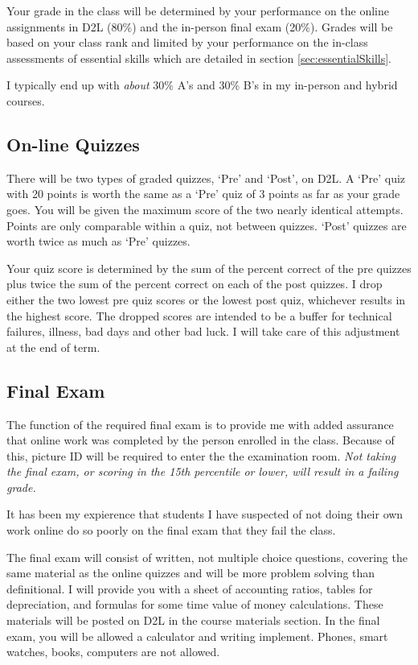 \documentclass[letterpaper,10pt]{article}
\begin{document}
\else
  Your grade in the class will be determined by your performance on the online assignments in D2L (80\%) and the in-person final exam (20\%).  Grades will be based on your class rank and limited by your performance on the in-class assessments of essential skills which are detailed in section \ref{sec:essentialSkills}. 
  
  I typically end up with \emph{about} 30\%
  A's and 30\% B's in my in-person and hybrid courses.    
\fi

\subsection{On-line Quizzes}

There will be two types of graded quizzes, `Pre' and `Post', on D2L.  A `Pre'
quiz with 20 points is worth the same as a `Pre' quiz of 3 points as
far as your grade goes.  You will be given the maximum score of the two nearly identical attempts. Points are only comparable within a quiz, not between quizzes.  `Post' quizzes are worth twice as much as `Pre' quizzes.


Your quiz score is determined by the sum of the percent correct of the pre quizzes plus twice the sum of the percent correct on each of the post quizzes. I drop either the two lowest pre quiz scores or the lowest post quiz, whichever results in the highest score. 
The dropped scores are intended to be a buffer for technical
failures, illness, bad days and other bad luck.  I will take care of this adjustment at the end of term.  

\subsection{Final Exam}

The function of the required final exam is to provide me with added assurance that online work was completed by the person enrolled in the class.  Because of this, picture ID will be required to enter the the examination room.  \emph{Not taking the final exam, or scoring in the 15th percentile or lower, will result in a failing grade.}

It has been my expierence that students I have suspected of not doing their own work online do so poorly on the final exam that they fail the class.

The final exam will consist of written, not multiple choice questions, covering the same material as the online quizzes and will be more problem solving than definitional. I will provide you with a sheet of accounting ratios, tables for depreciation, and formulas for some time value of money calculations.  These materials will be posted on D2L in the course materials section.  In the final exam, you will be allowed a calculator and writing implement.  Phones, smart watches, books, computers are not allowed.
\end{document}
